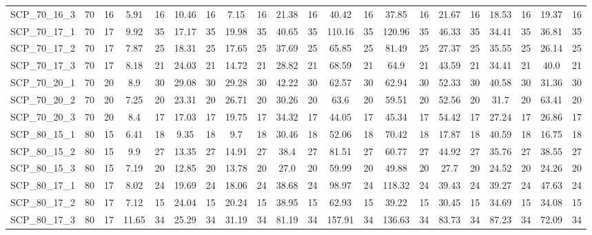 \begin{sidewaystable}[!ht]
{\begin{tabular}{lcccccccccccccccccccc}
SCP\_70\_16\_3 & 70 & 16 &  \textcolor{blue2}{5.91} & 16 & 10.46 & 16 & 7.15 & 16 & 21.38 & 16 & 40.42 & 16 & 37.85 & 16 & 21.67 & 16 & 18.53 & 16 & 19.37 & 16 \\
SCP\_70\_17\_1 & 70 & 17 &  \textcolor{blue2}{9.92} & 35 & 17.17 & 35 & 19.98 & 35 & 40.65 & 35 & 110.16 & 35 & 120.96 & 35 & 46.33 & 35 & 34.41 & 35 & 36.81 & 35 \\
SCP\_70\_17\_2 & 70 & 17 &  \textcolor{blue2}{7.87} & 25 & 18.31 & 25 & 17.65 & 25 & 37.69 & 25 & 65.85 & 25 & 81.49 & 25 & 27.37 & 25 & 35.55 & 25 & 26.14 & 25 \\
SCP\_70\_17\_3 & 70 & 17 &  \textcolor{blue2}{8.18} & 21 & 24.03 & 21 & 14.72 & 21 & 28.82 & 21 & 68.59 & 21 & 64.9 & 21 & 43.59 & 21 & 34.41 & 21 & 40.0 & 21 \\
SCP\_70\_20\_1 & 70 & 20 &  \textcolor{blue2}{8.9} & 30 & 29.08 & 30 & 29.28 & 30 & 42.22 & 30 & 62.57 & 30 & 62.94 & 30 & 52.33 & 30 & 40.58 & 30 & 31.36 & 30 \\
SCP\_70\_20\_2 & 70 & 20 &  \textcolor{blue2}{7.25} & 20 & 23.31 & 20 & 26.71 & 20 & 30.26 & 20 & 63.6 & 20 & 59.51 & 20 & 52.56 & 20 & 31.7 & 20 & 63.41 & 20 \\
SCP\_70\_20\_3 & 70 & 20 &  \textcolor{blue2}{8.4} & 17 & 17.03 & 17 & 19.75 & 17 & 34.32 & 17 & 44.05 & 17 & 45.34 & 17 & 54.42 & 17 & 27.24 & 17 & 26.86 & 17 \\
SCP\_80\_15\_1 & 80 & 15 &  \textcolor{blue2}{6.41} & 18 & 9.35 & 18 & 9.7 & 18 & 30.46 & 18 & 52.06 & 18 & 70.42 & 18 & 17.87 & 18 & 40.59 & 18 & 16.75 & 18 \\
SCP\_80\_15\_2 & 80 & 15 &  \textcolor{blue2}{9.9} & 27 & 13.35 & 27 & 14.91 & 27 & 38.4 & 27 & 81.51 & 27 & 60.77 & 27 & 44.92 & 27 & 35.76 & 27 & 38.55 & 27 \\
SCP\_80\_15\_3 & 80 & 15 &  \textcolor{blue2}{7.19} & 20 & 12.85 & 20 & 13.78 & 20 & 27.0 & 20 & 59.99 & 20 & 49.88 & 20 & 27.7 & 20 & 24.52 & 20 & 24.26 & 20 \\
SCP\_80\_17\_1 & 80 & 17 &  \textcolor{blue2}{8.02} & 24 & 19.69 & 24 & 18.06 & 24 & 38.68 & 24 & 98.97 & 24 & 118.32 & 24 & 39.43 & 24 & 39.27 & 24 & 47.63 & 24 \\
SCP\_80\_17\_2 & 80 & 17 &  \textcolor{blue2}{7.12} & 15 & 24.04 & 15 & 20.24 & 15 & 38.95 & 15 & 62.93 & 15 & 39.22 & 15 & 30.45 & 15 & 34.69 & 15 & 34.08 & 15 \\
SCP\_80\_17\_3 & 80 & 17 &  \textcolor{blue2}{11.65} & 34 & 25.29 & 34 & 31.19 & 34 & 81.19 & 34 & 157.91 & 34 & 136.63 & 34 & 83.73 & 34 & 87.23 & 34 & 72.09 & 34 \\

\end{tabular}}
\end{sidewaystable}

